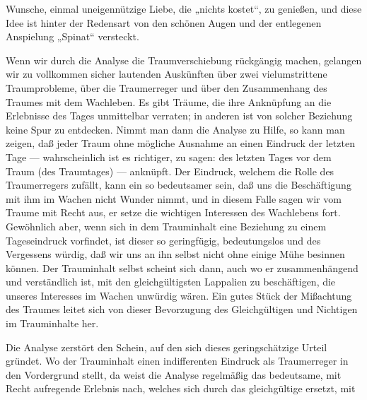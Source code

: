 \documentclass[twoside=true,titlepage=false,open=any, parskip=never, fontsize=10pt, headings=small, chapterprefix=false, appendixprefix=false]{scrbook}
\begin{document}
         
            
            
            
        \pstart
        Wunsche, einmal uneigennützige Liebe, die „nichts kostet“, zu
               genießen, und diese Idee ist hinter der Redensart von den schönen Augen und der
               entlegenen Anspielung „Spinat“ versteckt.
        \pend
    
            
        \pstart
        Wenn wir durch die Analyse die Traumverschiebung rückgängig machen,
               gelangen wir zu vollkommen sicher lautenden Auskünften über zwei vielumstrittene
               Traumprobleme, über die Traumerreger und über den Zusammenhang des Traumes
               mit dem Wachleben. Es gibt Träume, die ihre Anknüpfung an die Erlebnisse
               des Tages unmittelbar verraten; in anderen ist von solcher Beziehung keine Spur
               zu entdecken. Nimmt man dann die Analyse zu Hilfe, so kann man zeigen, daß jeder
               Traum ohne mögliche Ausnahme an einen Eindruck der letzten Tage —
               wahrscheinlich ist es richtiger, zu sagen: des letzten Tages vor dem Traum (des
               Traumtages) — anknüpft. Der Eindruck, welchem die Rolle des Traumerregers
               zufällt, kann ein so bedeutsamer sein, daß uns die Beschäftigung mit ihm im
               Wachen nicht Wunder nimmt, und in diesem Falle sagen wir vom Traume mit
               Recht aus, er setze die wichtigen Interessen des Wachlebens fort. Gewöhnlich
               aber, wenn sich in dem Trauminhalt eine Beziehung zu einem Tageseindruck
               vorfindet, ist dieser so geringfügig, bedeutungslos und des
               Vergessens würdig, daß wir uns an ihn selbst nicht ohne einige Mühe besinnen
               können. Der Trauminhalt selbst scheint sich dann, auch wo er
               zusammenhängend und verständlich ist, mit den gleichgültigsten Lappalien zu
               beschäftigen, die unseres Interesses im Wachen unwürdig wären. Ein gutes Stück
               der Mißachtung des Traumes leitet sich von dieser Bevorzugung des Gleichgültigen
               und Nichtigen im Trauminhalte her.
        \pend
    
            
        \pstart
        Die Analyse zerstört den Schein, auf den sich dieses geringschätzige
               Urteil gründet. Wo der Trauminhalt einen indifferenten Eindruck als Traumerreger
               in den Vordergrund stellt, da weist die Analyse regelmäßig das bedeutsame, mit
               Recht aufregende Erlebnis nach, welches sich durch das gleichgültige ersetzt,
               mit
        \pend
    
\end{document}
